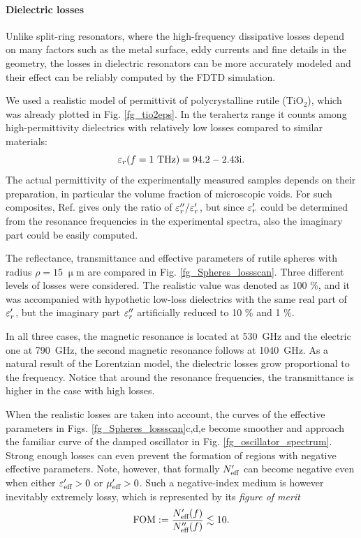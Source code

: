 \paragraph{Dielectric losses}%
Unlike split-ring resonators, where the high-frequency dissipative losses depend on many factors such as the metal surface, eddy currents and fine details in the geometry, the losses in dielectric resonators can be more accurately modeled and their effect can be reliably computed by the FDTD simulation. 

We used a realistic model \cite{baumard1977_epsilon_TiO2} of permittivit of polycrystalline rutile (TiO$_{2}$), which was already plotted in Fig. \ref{fg_tio2eps}. In the terahertz range it counts among high-permittivity dielectrics with relatively low losses compared to similar materials:
\begin{equation}\varepsilon_r(f=1\text{ THz}) = 94.2-2.43\text{i}. \label{eq_tio2}\end{equation}
The actual permittivity of the experimentally measured samples depends on their preparation, in particular the volume fraction of microscopic voids. For such composites, Ref. \cite{baumard1977_epsilon_TiO2} gives only the ratio of $\varepsilon_r''/\varepsilon_r'$, but since $\varepsilon_r'$ could be determined from the resonance frequencies in the experimental spectra, also the imaginary part could be easily computed.

The reflectance, transmittance and effective parameters of rutile spheres with radius $\rho=15\;\upmu$m are compared in Fig. \ref{fg_Spheres_lossscan}. Three different levels of losses were considered. The realistic value was denoted as 100 \%, and it was accompanied with hypothetic low-loss dielectrics with the same real part of $\varepsilon_r'$, but the imaginary part $\varepsilon_r''$ artificially reduced to  10 \% and 1 \%. 

In all three cases, the magnetic resonance is located at 530~GHz and the electric one at 790~GHz, the second magnetic resonance follows at 1040~GHz. As a natural result of the Lorentzian model, the dielectric losses grow proportional to the frequency. Notice that around the resonance frequencies, the transmittance is higher in the case with high losses.

When the realistic losses are taken into account, the curves of the effective parameters in Figs. \ref{fg_Spheres_lossscan}c,d,e become smoother and approach the familiar curve of the damped oscillator in Fig. \ref{fg_oscillator_spectrum}. Strong enough losses can even prevent the formation of regions with negative effective parameters. Note, however, that formally $N_{\text{eff} }'$ can become negative \cite[pp. 12--15]{pazoutova2011dp} even when either $\varepsilon_{\text{eff} }'>0$ or $\mu_{\text{eff} }'>0$. Such a negative-index medium is however inevitably extremely lossy, which is represented by its \textit{figure of merit}
\begin{equation} \text{FOM} := \frac{N_{\text{eff} }'(f)}{N_{\text{eff} }''(f)} \lesssim 10. \label{eq_fom}\end{equation}

